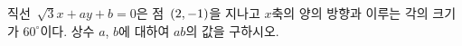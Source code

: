 직선~$\sqrt{3}x+ay+b=0$은 점~$(2{,}\mkern3mu\mathopen{}-1)$을 지나고 $x$축의 양의 방향과 이루는 각의 크기가 $60^\circ$이다. 상수 $a$, $b$에 대하여 $ab$의 값을 구하시오.
